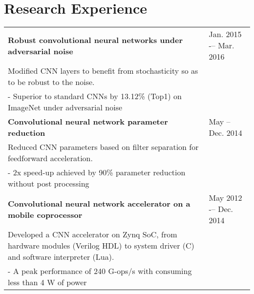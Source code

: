 \documentclass[11pt]{article}
\begin{document}
\section*{Research Experience}
\begin{tabular}{L{0.74\textwidth} R{0.22\textwidth}}

  {\bf Robust convolutional neural networks under adversarial noise} & Jan. 2015 -– Mar. 2016 \\ [0pt]
  Modified CNN layers to benefit from stochasticity so as to be robust to the noise. \\
  - Superior to standard CNNs by 13.12\% (Top1) on ImageNet under adversarial noise \\ [7pt]

  {\bf Convolutional neural network parameter reduction} & May -- Dec. 2014 \\ [0pt]
  Reduced CNN parameters based on filter separation for feedforward acceleration. \\
  - 2x speed-up achieved by 90\% parameter reduction without post processing \\ [7pt]

  {\bf Convolutional neural network accelerator on a mobile coprocessor} & May 2012 -– Dec. 2014 \\ [0pt]
  Developed a CNN accelerator on Zynq SoC, from hardware modules (Verilog HDL) to system driver (C) and software interpreter (Lua). \\
  - A peak performance of 240 G-ops/s with consuming less than 4 W of power \\ [7pt]




\end{tabular}
\end{document}
